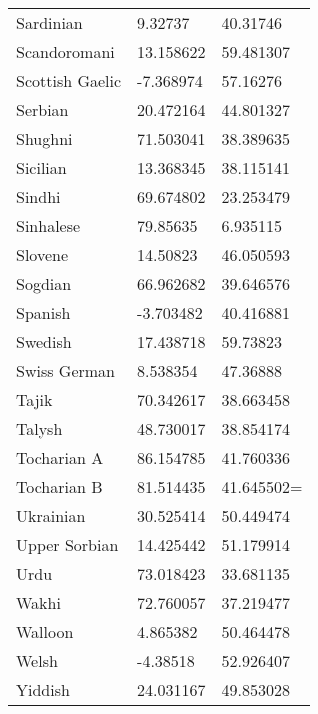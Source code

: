 \begin{longtable}{lll}
Sardinian & 9.32737 & 40.31746\\
Scandoromani & 13.158622 & 59.481307\\
Scottish Gaelic & -7.368974 & 57.16276\\
Serbian & 20.472164 & 44.801327\\
Shughni & 71.503041 & 38.389635\\
Sicilian & 13.368345 & 38.115141\\
Sindhi & 69.674802 & 23.253479\\
Sinhalese & 79.85635 & 6.935115\\
Slovene & 14.50823 & 46.050593\\
Sogdian & 66.962682 & 39.646576\\
Spanish & -3.703482 & 40.416881\\
Swedish & 17.438718 & 59.73823\\
Swiss German & 8.538354 & 47.36888\\
Tajik & 70.342617 & 38.663458\\
Talysh & 48.730017 & 38.854174\\
Tocharian A & 86.154785 & 41.760336\\
Tocharian B & 81.514435 & 41.645502=\\
Ukrainian & 30.525414 & 50.449474\\
Upper Sorbian & 14.425442 & 51.179914\\
Urdu & 73.018423 & 33.681135\\
Wakhi & 72.760057 & 37.219477\\
Walloon & 4.865382 & 50.464478\\
Welsh & -4.38518 & 52.926407\\
Yiddish & 24.031167 & 49.853028\\
\bottomrule
\end{longtable}